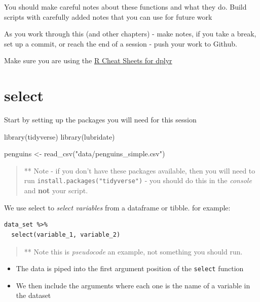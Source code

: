 \documentclass[
]{book}
\newenvironment{Shaded}{\begin{snugshade}}{\end{snugshade}}
\newcommand{\FunctionTok}[1]{\textcolor[rgb]{0.00,0.00,0.00}{#1}}
\newcommand{\NormalTok}[1]{#1}
\newcommand{\OtherTok}[1]{\textcolor[rgb]{0.56,0.35,0.01}{#1}}
\newcommand{\StringTok}[1]{\textcolor[rgb]{0.31,0.60,0.02}{#1}}
\begin{document}
You should make careful notes about these functions and what they do. Build scripts with carefully added notes that you can use for future work

As you work through this (and other chapters) - make notes, if you take a break, set up a commit, or reach the end of a session - push your work to Github.

Make sure you are using the \href{https://www.rstudio.com/resources/cheatsheets/}{R Cheat Sheets for dplyr}

\hypertarget{select}{%
\section{select}\label{select}}

Start by setting up the packages you will need for this session

\begin{Shaded}
\begin{Highlighting}[]
\FunctionTok{library}\NormalTok{(tidyverse)}
\FunctionTok{library}\NormalTok{(lubridate)}

\NormalTok{penguins }\OtherTok{\textless{}{-}} \FunctionTok{read\_csv}\NormalTok{(}\StringTok{"data/penguins\_simple.csv"}\NormalTok{)}
\end{Highlighting}
\end{Shaded}

\begin{quote}
** Note - if you don't have these packages available, then you will need to run \texttt{install.packages("tidyverse")} - you should do this in the \emph{console} and \textbf{not} your script.
\end{quote}

We use select to \emph{select variables} from a dataframe or tibble. for example:

\begin{verbatim}
data_set %>% 
  select(variable_1, variable_2)
\end{verbatim}

\begin{quote}
** Note this is \emph{pseudocode} an example, not something you should run.
\end{quote}

\begin{itemize}
\item
  The data is piped into the first argument position of the \texttt{select} function
\item
  We then include the arguments where each one is the name of a variable in the dataset
\end{itemize}
\end{document}
